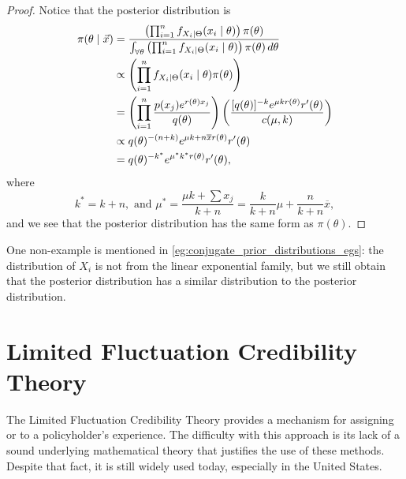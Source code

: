 \documentclass[notoc,notitlepage]{tufte-book}
\begin{document}
\begin{proof}
  Notice that the posterior distribution is
  \begin{align*}
    \pi(\theta \mid \vec{x})
    &= \frac{\left( \prod_{i=1}^{n} f_{X_i \mid \Theta}(x_i \mid \theta) \right)
      \pi(\theta)}{\int_{\forall \theta} \left( \prod_{i=1}^{n} f_{X_i \mid
      \Theta}(x_i \mid \theta) \right) \pi(\theta) \mathop{}\!d{\theta}} \\
    &\propto \left( \prod_{i=1}^{n} f_{X_i \mid \Theta}(x_i \mid \theta)
      \pi(\theta) \right) \\
    &= \left( \prod_{i=1}^{n} \frac{p(x_j)e^{r(\theta) x_j}}{q(\theta)} \right)
      \left( \frac{[q(\theta)]^{-k} e^{\mu kr(\theta)} r'(\theta)}{c(\mu, k)}
      \right) \\
    &\propto q(\theta)^{-(n+k)} e^{\mu k + n \overline{x} r(\theta)} r'(\theta)
    \\
    &= q(\theta)^{-k^*} e^{\mu^* k^* r(\theta)} r'(\theta),
  \end{align*}
  where
  \begin{equation*}
    k^* = k + n, \text{ and } \mu^* = \frac{\mu k + \sum x_j}{k + n} =
    \frac{k}{k + n} \mu + \frac{n}{k + n} \overline{x},
  \end{equation*}
  and we see that the posterior distribution has the same form as
  $\pi(\theta)$.
\end{proof}

\begin{eg}
  One non-example is mentioned in \cref{eg:conjugate_prior_distributions_egs}:
  the distribution of $X_i$ is not from the linear exponential family, but we
  still obtain that the posterior distribution has a similar distribution to the
  posterior distribution.
\end{eg}




\chapter{Limited Fluctuation Credibility Theory}%
\label{chp:limited_fluctuation_credibility_theory}

The Limited Fluctuation Credibility Theory provides a mechanism for assigning
 or  to a policyholder's experience.
The difficulty with this approach is its lack of a sound underlying mathematical
theory that justifies the use of these methods. Despite that fact, it is still
widely used today, especially in the United States.
\end{document}
